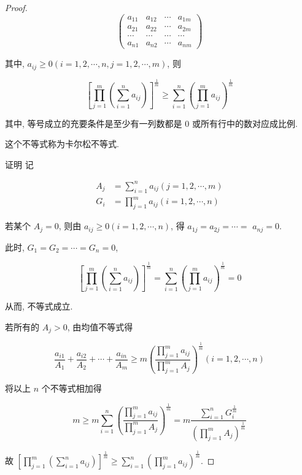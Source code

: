 \begin{proof}
	$$
	\left(\begin{array}{cccc}
	a_{11} & a_{12} & \cdots & a_{1 m} \\
	a_{21} & a_{22} & \cdots & a_{2 m} \\
	\cdots & \cdots & \cdots & \cdots \\
	a_{n 1} & a_{n 2} & \cdots & a_{n m}
	\end{array}\right)
	$$
	
	其中, $a_{i j} \geqslant 0(i=1,2, \cdots, n, j=1,2, \cdots, m)$, 则
	
	$$
	\left[\prod_{j=1}^{m}\left(\sum_{i=1}^{n} a_{i j}\right)\right]^{\frac{1}{m}} \geqslant \sum_{i=1}^{n}\left(\prod_{j=1}^{m} a_{i j}\right)^{\frac{1}{m}}
	$$
	
	其中, 等号成立的充要条件是至少有一列数都是 0 或所有行中的数对应成比例.
	
	这个不等式称为卡尔松不等式.
	
	证明 记
	
	$$
	\begin{aligned}
	A_{j} & =\sum_{i=1}^{n} a_{i j}(j=1,2, \cdots, m) \\
	G_{i} & =\prod_{j=1}^{m} a_{i j}(i=1,2, \cdots, n)
	\end{aligned}
	$$
	
	若某个 $A_{j}=0$, 则由 $a_{i j} \geqslant 0(i=1,2, \cdots, n)$, 得 $a_{1 j}=a_{2 j}=\cdots=$ $a_{n j}=0$.
	
	此时, $G_{1}=G_{2}=\cdots=G_{n}=0$,
	
	$$
	\left[\prod_{j=1}^{m}\left(\sum_{i=1}^{n} a_{i j}\right)\right]^{\frac{1}{m}}=\sum_{i=1}^{n}\left(\prod_{j=1}^{m} a_{i j}\right)^{\frac{1}{m}}=0
	$$
	
	从而, 不等式成立.
	
	若所有的 $A_{j}>0$, 由均值不等式得
	
	$$
	\frac{a_{i 1}}{A_{1}}+\frac{a_{i 2}}{A_{2}}+\cdots+\frac{a_{i n}}{A_{m}} \geqslant m\left(\frac{\prod_{j=1}^{m} a_{i j}}{\prod_{j=1}^{m} A_{j}}\right)^{\frac{1}{m}}(i=1,2, \cdots, n)
	$$
	
	将以上 $n$ 个不等式相加得
	
	$$
	m \geqslant m \sum_{i=1}^{n}\left(\frac{\prod_{j=1}^{m} a_{i j}}{\prod_{j=1}^{m} A_{j}}\right)^{\frac{1}{m}}=m \frac{\sum_{i=1}^{n} G_{i}^{\frac{1}{m}}}{\left(\prod_{j=1}^{m} A_{j}\right)^{\frac{1}{m}}}
	$$
	
	故 $\left[\prod_{j=1}^{m}\left(\sum_{i=1}^{n} a_{i j}\right)\right]^{\frac{1}{m}} \geqslant \sum_{i=1}^{n}\left(\prod_{j=1}^{m} a_{i j}\right)^{\frac{1}{m}}$.
	

\end{proof}
